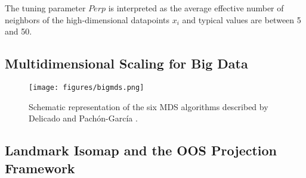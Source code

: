 The tuning parameter $Perp$ is interpreted as the average effective number of neighbors of the high-dimensional datapoints $x_i$ and typical values are between 5 and 50.

\subsection{Multidimensional Scaling for Big Data}

\begin{figure}[ht]
    \centering
    \texttt{[image: figures/bigmds.png]}
    \caption{Schematic representation of the six MDS algorithms described by Delicado and Pachón-García \cite{Delicado2024MDSBigData}.}
    \label{fig:python_tsne_benchmarks}
\end{figure}

\subsection{Landmark Isomap and the OOS Projection Framework}